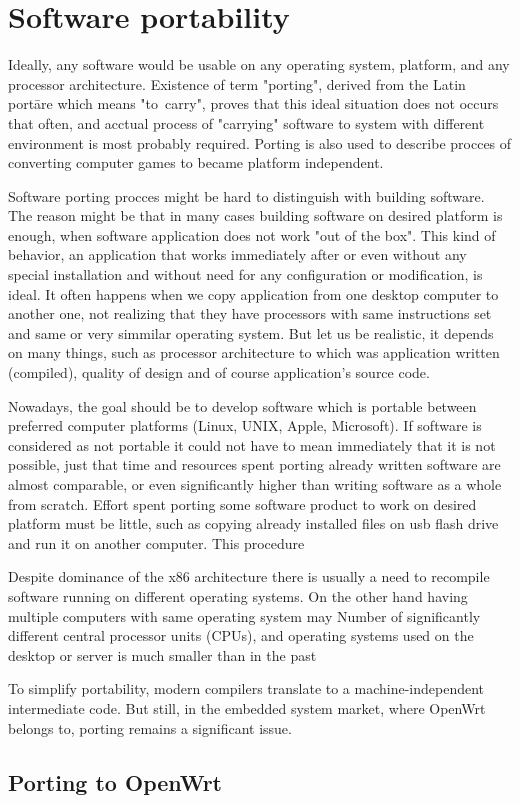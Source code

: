 \chapter{Software portability}\label{porting}

Ideally, any software would be usable on any operating system, platform, and any processor architecture.
Existence of term "porting", derived from the Latin portāre which means "to~carry", proves that this ideal situation does not occurs that often, and acctual process of "carrying" software to system with different environment is most probably required.
Porting is also used to describe procces of converting computer games to became platform independent.

Software porting procces might be hard to distinguish with building software.
The reason might be that in many cases building software on desired platform is enough, when software application does not work "out of the box".
This kind of behavior, an application that works immediately after or even without any special installation and without need for any configuration or modification, is ideal.
It often happens when we copy application from one desktop computer to another one, not realizing that they have processors with same instructions set and same or very simmilar operating system.
But let us be realistic, it depends on many things, such as processor architecture to which was application written (compiled), quality of design and of course application's source code.

Nowadays, the goal should be to develop software which is portable between preferred computer platforms (Linux, UNIX, Apple, Microsoft).
If software is considered as not portable it could not have to mean immediately that it is not possible, just that time and resources spent porting already written software are almost comparable, or even significantly higher than writing software as a whole from scratch.
Effort spent porting some software product to work on desired platform must be little, such as copying already installed files on usb flash drive and run it on another computer.
This procedure

Despite dominance of the x86 architecture there is usually a need to recompile software running on different operating systems.
On the other hand having multiple computers with same operating system may
Number of significantly different central processor units (CPUs), and operating systems used on the desktop or server is much smaller than in the past


To simplify portability, modern compilers translate to a machine-independent intermediate code.
But still, in the embedded system market, where OpenWrt belongs to, porting remains a significant issue.

\section{Porting to OpenWrt}



